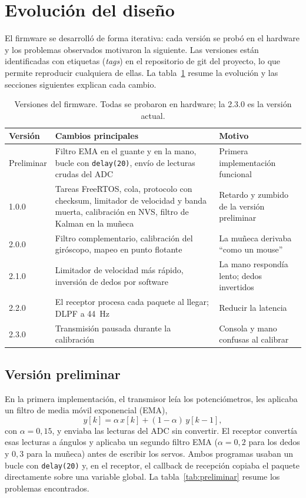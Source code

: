 \section{Evolución del diseño}
\label{sec:evolucion}

El firmware se desarrolló de forma iterativa: cada versión se probó en el hardware y los problemas observados motivaron la siguiente. Las versiones están identificadas con etiquetas (\textit{tags}) en el repositorio de git del proyecto, lo que permite reproducir cualquiera de ellas. La tabla~\ref{tab:versiones} resume la evolución y las secciones siguientes explican cada cambio.

\begin{table}[H]
\centering
\begin{tabularx}{\textwidth}{l X X}
\toprule
\textbf{Versión} & \textbf{Cambios principales} & \textbf{Motivo} \\
\midrule
Preliminar & Filtro EMA en el guante y en la mano, bucle con \texttt{delay(20)}, envío de lecturas crudas del ADC & Primera implementación funcional \\
1.0.0 & Tareas FreeRTOS, cola, protocolo con checksum, limitador de velocidad y banda muerta, calibración en NVS, filtro de Kalman en la muñeca & Retardo y zumbido de la versión preliminar \\
2.0.0 & Filtro complementario, calibración del giróscopo, mapeo en punto flotante & La muñeca derivaba ``como un mouse'' \\
2.1.0 & Limitador de velocidad más rápido, inversión de dedos por software & La mano respondía lento; dedos invertidos \\
2.2.0 & El receptor procesa cada paquete al llegar; DLPF a \SI{44}{\hertz} & Reducir la latencia \\
2.3.0 & Transmisión pausada durante la calibración & Consola y mano confusas al calibrar \\
\bottomrule
\end{tabularx}
\caption{Versiones del firmware. Todas se probaron en hardware; la 2.3.0 es la versión actual.}
\label{tab:versiones}
\end{table}

\subsection{Versión preliminar}

En la primera implementación, el transmisor leía los potenciómetros, les aplicaba un filtro de media móvil exponencial (EMA),
\begin{equation}
y[k] = \alpha\, x[k] + (1-\alpha)\, y[k-1],
\end{equation}
con $\alpha = 0{,}15$, y enviaba las lecturas del ADC sin convertir. El receptor convertía esas lecturas a ángulos y aplicaba un segundo filtro EMA ($\alpha = 0{,}2$ para los dedos y $0{,}3$ para la muñeca) antes de escribir los servos. Ambos programas usaban un bucle con \texttt{delay(20)} y, en el receptor, el callback de recepción copiaba el paquete directamente sobre una variable global. La tabla~\ref{tab:preliminar} resume los problemas encontrados.

